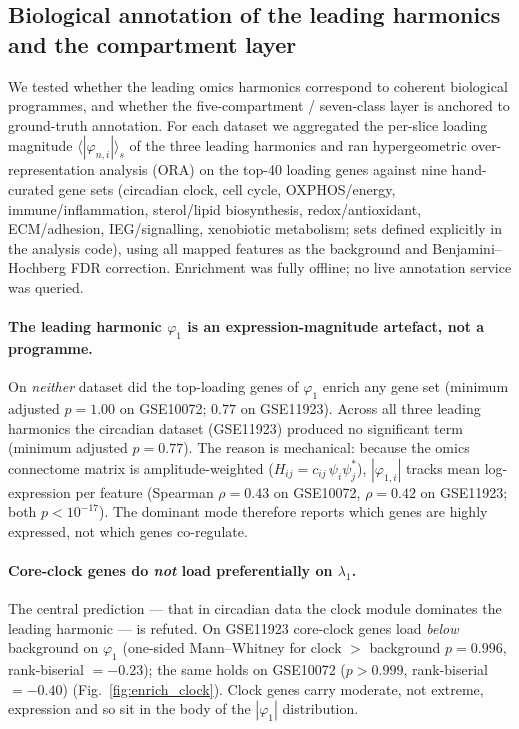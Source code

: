 \subsection{Biological annotation of the leading harmonics and the compartment layer}
\label{sec:enrich}

We tested whether the leading omics harmonics correspond to coherent biological
programmes, and whether the five-compartment / seven-class layer is anchored to
ground-truth annotation. For each dataset we aggregated the per-slice loading
magnitude $\langle|\varphi_{n,i}|\rangle_s$ of the three leading harmonics and ran
hypergeometric over-representation analysis (ORA) on the top-40 loading genes against
nine hand-curated gene sets (circadian clock, cell cycle, OXPHOS/energy,
immune/inflammation, sterol/lipid biosynthesis, redox/antioxidant, ECM/adhesion,
IEG/signalling, xenobiotic metabolism; sets defined explicitly in the analysis code),
using all mapped features as the background and Benjamini--Hochberg FDR correction.
Enrichment was fully offline; no live annotation service was queried.

\paragraph{The leading harmonic $\varphi_1$ is an expression-magnitude artefact, not a
programme.} On \emph{neither} dataset did the top-loading genes of $\varphi_1$ enrich
any gene set (minimum adjusted $p = 1.00$ on GSE10072; $0.77$ on GSE11923). Across all
three leading harmonics the circadian dataset (GSE11923) produced no significant term
(minimum adjusted $p = 0.77$). The reason is mechanical: because the omics connectome
matrix is amplitude-weighted ($H_{ij}=c_{ij}\,\psi_i\psi_j^\ast$), $|\varphi_{1,i}|$
tracks mean log-expression per feature (Spearman $\rho = 0.43$ on GSE10072, $\rho =
0.42$ on GSE11923; both $p<10^{-17}$). The dominant mode therefore reports which genes
are highly expressed, not which genes co-regulate.

\paragraph{Core-clock genes do \emph{not} load preferentially on $\lambda_1$.} The
central prediction --- that in circadian data the clock module dominates the leading
harmonic --- is refuted. On GSE11923 core-clock genes load \emph{below} background on
$\varphi_1$ (one-sided Mann--Whitney for clock $>$ background $p = 0.996$, rank-biserial
$= -0.23$); the same holds on GSE10072 ($p > 0.999$, rank-biserial $= -0.40$)
(Fig.~\ref{fig:enrich_clock}). Clock genes carry moderate, not extreme, expression and
so sit in the body of the $|\varphi_1|$ distribution.

